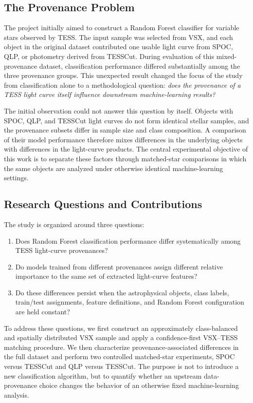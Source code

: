 \documentclass[linenumbers]{aastex701}
\begin{document}
\subsection{The Provenance Problem}
The project initially aimed to construct a Random Forest classifier for variable stars observed by TESS. The input sample was selected from VSX, and each object in the original dataset contributed one usable light curve from SPOC, QLP, or photometry derived from TESSCut. During evaluation of this mixed-provenance dataset, classification performance differed substantially among the three provenance groups. This unexpected result changed the focus of the study from classification alone to a methodological question: \emph{does the provenance of a TESS light curve itself influence downstream machine-learning results?}

The initial observation could not answer this question by itself. Objects with SPOC, QLP, and TESSCut light curves do not form identical stellar samples, and the provenance subsets differ in sample size and class composition. A comparison of their model performance therefore mixes differences in the underlying objects with differences in the light-curve products. The central experimental objective of this work is to separate these factors through matched-star comparisons in which the same objects are analyzed under otherwise identical machine-learning settings.

\subsection{Research Questions and Contributions}
The study is organized around three questions:
\begin{enumerate}
\item Does Random Forest classification performance differ systematically among TESS light-curve provenances?
\item Do models trained from different provenances assign different relative importance to the same set of extracted light-curve features?
\item Do these differences persist when the astrophysical objects, class labels, train/test assignments, feature definitions, and Random Forest configuration are held constant?
\end{enumerate}

To address these questions, we first construct an approximately class-balanced and spatially distributed VSX sample and apply a confidence-first VSX--TESS matching procedure. We then characterize provenance-associated differences in the full dataset and perform two controlled matched-star experiments, SPOC versus TESSCut and QLP versus TESSCut. The purpose is not to introduce a new classification algorithm, but to quantify whether an upstream data-provenance choice changes the behavior of an otherwise fixed machine-learning analysis.
\end{document}
